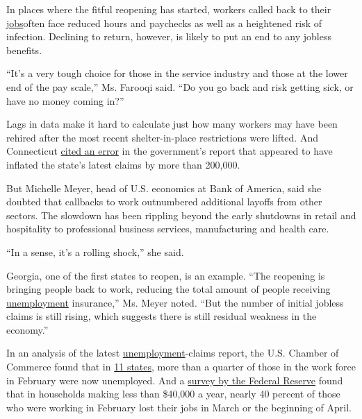 In places where the fitful reopening has started, workers called back to
their
\href{https://www.nytimes3xbfgragh.onion/2020/05/28/business/economy/coronavirus-stimulus-unemployment.html}{jobs}often
face reduced hours and paychecks as well as a heightened risk of
infection. Declining to return, however, is likely to put an end to any
jobless benefits.

``It's a very tough choice for those in the service industry and those
at the lower end of the pay scale,'' Ms. Farooqi said. ``Do you go back
and risk getting sick, or have no money coming in?''

Lags in data make it hard to calculate just how many workers may have
been rehired after the most recent shelter-in-place restrictions were
lifted. And Connecticut
\href{https://twitter.com/CTDOL/status/1260962610729619456/photo/1}{cited
an error} in the government's report that appeared to have inflated the
state's latest claims by more than 200,000.

But Michelle Meyer, head of U.S. economics at Bank of America, said she
doubted that callbacks to work outnumbered additional layoffs from other
sectors. The slowdown has been rippling beyond the early shutdowns in
retail and hospitality to professional business services, manufacturing
and health care.

``In a sense, it's a rolling shock,'' she said.

Georgia, one of the first states to reopen, is an example. ``The
reopening is bringing people back to work, reducing the total amount of
people receiving
\href{https://www.nytimes3xbfgragh.onion/2020/05/21/business/stock-market-today-coronavirus.html}{unemployment}
insurance,'' Ms. Meyer noted. ``But the number of initial jobless claims
is still rising, which suggests there is still residual weakness in the
economy.''

In an analysis of the latest
\href{https://www.nytimes3xbfgragh.onion/2020/05/28/business/economy/coronavirus-unemployment-claims.html}{unemployment}-claims
report, the U.S. Chamber of Commerce found that in
\href{https://www.uschamber.com/series/above-the-fold/analysis-these-10-states-have-seen-the-highest-share-of-their-workforce-file}{11
states}, more than a quarter of those in the work force in February were
now unemployed. And a
\href{https://www.nytimes3xbfgragh.onion/2020/05/14/business/economy/coronavirus-poor-economy.html}{survey
by the Federal Reserve} found that in households making less than
\$40,000 a year, nearly 40 percent of those who were working in February
lost their jobs in March or the beginning of April.

